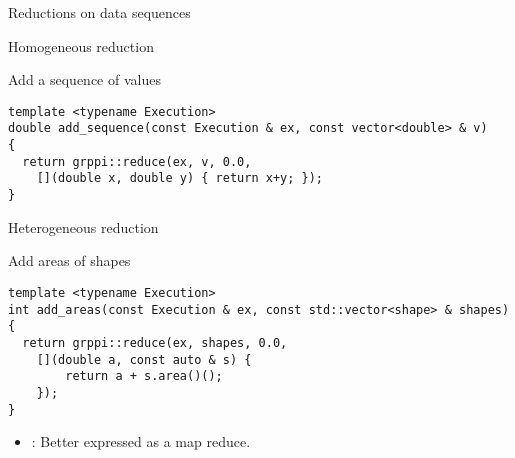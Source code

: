 \begin{frame}[t]{Reductions on data sequences}
\begin{itemize}
\end{itemize}
\end{frame}

\begin{frame}[t,fragile]{Homogeneous reduction}
\begin{block}{Add a sequence of values}
\begin{lstlisting}
template <typename Execution>
double add_sequence(const Execution & ex, const vector<double> & v)
{
  return grppi::reduce(ex, v, 0.0,
    [](double x, double y) { return x+y; });
}
\end{lstlisting}
\end{block}
\end{frame}

\begin{frame}[t,fragile]{Heterogeneous reduction}
\begin{block}{Add areas of shapes}
\begin{lstlisting}
template <typename Execution>
int add_areas(const Execution & ex, const std::vector<shape> & shapes)
{
  return grppi::reduce(ex, shapes, 0.0,
    [](double a, const auto & s) { 
        return a + s.area()(); 
    });
}
\end{lstlisting}
\end{block}
\begin{itemize}
  \item {}: Better expressed as a map reduce.
\end{itemize}
\end{frame}
